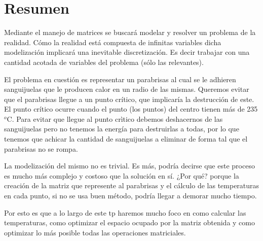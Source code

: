 \section{Resumen}

Mediante el manejo de matrices se buscará modelar y resolver un problema de la realidad. Cómo la realidad está compuesta de infinitas variables dicha modelización implicará una inevitable discretización. Es decir trabajar con una 
cantidad acotada de variables del problema (sólo las relevantes).

El problema en cuestión es representar un parabrisas al cual se le adhieren sanguijuelas que le producen calor en un radio de las mismas. Queremos evitar que el parabrisas llegue a un punto crítico, que implicaría la destrucción de este. El punto crítico ocurre cuando el punto (los puntos) del centro tienen más de 235${}^o$C. Para evitar que llegue al punto crìtico debemos deshacernos de las sanguijuelas pero no tenemos la energía para destruirlas a todas, por lo que tenemos que achicar la cantidad de sanguijuelas a eliminar de forma tal que el parabrisas no se rompa.

La modelización del mismo no es trivial. Es más, podría decirse que este proceso es mucho más complejo y costoso que la solución en sí. ¿Por qué? porque la creación de la matriz que represente al parabrisas y el cálculo de las temperaturas en cada punto, si no se usa buen método, podría llegar a demorar mucho tiempo.

Por esto es que a lo largo de este tp haremos mucho foco en como calcular las temperaturas, como optimizar el espacio ocupado por la matriz obtenida y como optimizar lo más posible todas las operaciones matriciales.


